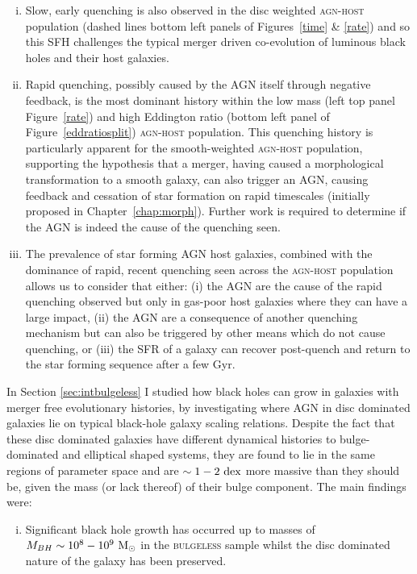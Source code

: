 {\begin{enumerate}[(i)]
\item Slow, early quenching is also observed in the disc weighted \textsc{agn-host} population (dashed lines bottom left panels of Figures~\ref{time} \& \ref{rate}) and so this SFH challenges the typical merger driven co-evolution of luminous black holes and their host galaxies.

\item Rapid quenching, possibly caused by the AGN itself through negative feedback, is the most dominant history within the low mass (left top panel Figure~\ref{rate}) and high Eddington ratio (bottom left panel of Figure~\ref{eddratiosplit}) \textsc{agn-host} population. This quenching history is particularly apparent for the smooth-weighted \textsc{agn-host} population, supporting the hypothesis that a merger, having caused a morphological transformation to a smooth galaxy, can also trigger an AGN, causing feedback and cessation of star formation on rapid timescales (initially proposed in Chapter~\ref{chap:morph}). Further work is required to determine if the AGN is indeed the cause of the quenching seen. 

\item The prevalence of star forming AGN host galaxies, combined with the dominance of rapid, recent quenching seen across the \textsc{agn-host} population allows us to consider that either: (i)  the AGN are the cause of the rapid quenching observed but only in gas-poor host galaxies where they can have a large impact, (ii) the AGN are a consequence of another quenching mechanism but can also be triggered by other means which do not cause quenching, or (iii) the SFR of a galaxy can recover post-quench and return to the star forming sequence after a few Gyr.

\end{enumerate}

In Section \ref{sec:intbulgeless} I studied how black holes can grow in galaxies with merger free evolutionary histories, by investigating where AGN in disc dominated galaxies lie on typical black-hole galaxy scaling relations. Despite the fact that these disc dominated galaxies have different dynamical histories to bulge-dominated and elliptical shaped systems, they are found to lie in the same regions of parameter space and are $\sim1-2~\rm{dex}$ more massive than they should be, given the mass (or lack thereof) of their bulge component. The main findings were:
\begin{enumerate}[(i)]
\item Significant black hole growth has occurred up to masses of $M_{BH}\sim10^8 - 10^9~\rm{M}_{\odot}$ in the \textsc{bulgeless} sample whilst the disc dominated nature of the galaxy has been preserved.


\end{enumerate}}
